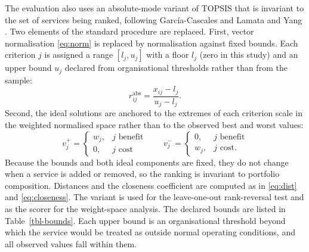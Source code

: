 \documentclass[
  journal,
]{IEEEtran}%
\begin{document}
The evaluation also uses an absolute-mode variant of TOPSIS that is
invariant to the set of services being ranked, following García-Cascales
and Lamata
 and Yang
. Two elements of
the standard procedure are replaced. First, vector normalisation
\eqref{eq:norm} is replaced by normalisation against fixed bounds. Each
criterion \(j\) is assigned a range \([l_j, u_j]\) with a floor \(l_j\)
(zero in this study) and an upper bound \(u_j\) declared from
organisational thresholds rather than from the sample:
\begin{equation}\label{eq:absnorm}
r^{\text{abs}}_{ij} = \frac{x_{ij} - l_j}{u_j - l_j}.
\end{equation} Second, the ideal solutions are anchored to the extremes
of each criterion scale in the weighted normalised space rather than to
the observed best and worst values: \begin{equation}\label{eq:absideal}
v_j^{+} =
\begin{cases}
w_j, & j \text{ benefit} \\
0,   & j \text{ cost}
\end{cases}
\qquad
v_j^{-} =
\begin{cases}
0,   & j \text{ benefit} \\
w_j, & j \text{ cost.}
\end{cases}
\end{equation} Because the bounds and both ideal components are fixed,
they do not change when a service is added or removed, so the ranking is
invariant to portfolio composition. Distances and the closeness
coefficient are computed as in \eqref{eq:dist} and \eqref{eq:closeness}.
The variant is used for the leave-one-out rank-reversal test and as the
scorer for the weight-space analysis. The declared bounds are listed in
Table~\ref{tbl-bounds}. Each upper bound is an organisational threshold
beyond which the service would be treated as outside normal operating
conditions, and all observed values fall within them.

\begin{table}

\caption{\label{tbl-bounds}Fixed criterion bounds for absolute-mode
TOPSIS}


\end{table}%
\end{document}
